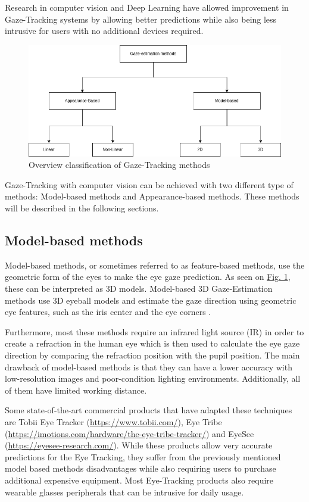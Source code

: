 \documentclass[letterpaper, 10 pt, conference]{ieeeconf}
\begin{document}
Research in computer vision and Deep Learning have allowed improvement in Gaze-Tracking systems by allowing better predictions while also being less intrusive for users with no additional devices required.


\begin{figure}
    \centering
    \includegraphics[scale=0.3]{figures/methods_classification.png}
    \caption{Overview classification of Gaze-Tracking methods }
    \label{GEClassification}
 \end{figure}


Gaze-Tracking with computer vision can be achieved with two different type of methods: Model-based methods and Appearance-based methods. These methods will be described in the following sections.

\subsection{Model-based methods}
Model-based methods, or sometimes referred to as feature-based methods, use the geometric form of the eyes to make the eye gaze prediction.
As seen on \hyperref[GEClassification]{Fig. 1}, these can be interpreted as 3D models. Model-based 3D Gaze-Estimation
methods use 3D eyeball models and estimate the gaze direction using geometric eye features, such as the iris center and the eye corners \cite{general_theory_remote_gaze_3d_model}.

Furthermore, most these methods require an infrared light source (IR) in order to create a refraction in the human eye which is then used to calculate the eye gaze direction by comparing the refraction position with the pupil position. The main drawback of model-based methods is that they can have a lower accuracy with low-resolution images and poor-condition lighting environments. Additionally, all of them have limited working distance.

Some state-of-the-art commercial products that have adapted these techniques are Tobii Eye Tracker (\url{https://www.tobii.com/}), Eye Tribe (\url{https://imotions.com/hardware/the-eye-tribe-tracker/}) and EyeSee (\url{https://eyesee-research.com/}). 
While these products allow very accurate predictions for the Eye Tracking, they suffer from the previously mentioned model based methods disadvantages while also requiring users to purchase additional expensive equipment. Most Eye-Tracking products also require wearable glasses peripherals that can be intrusive for daily usage. 
\end{document}
